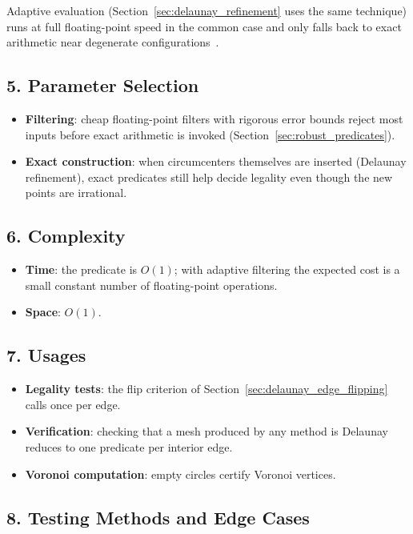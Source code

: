 Adaptive evaluation (Section~\ref{sec:delaunay_refinement} uses the same
technique) runs at full floating-point speed in the common case and only falls
back to exact arithmetic near degenerate configurations~\cite{shewchuk1997}.

\subsection{5. Parameter Selection}

\begin{itemize}
\item \textbf{Filtering}: cheap floating-point filters with rigorous error
  bounds reject most inputs before exact arithmetic is invoked
  (Section~\ref{sec:robust_predicates}).
\item \textbf{Exact construction}: when circumcenters themselves are inserted
  (Delaunay refinement), exact predicates still help decide legality even
  though the new points are irrational.
\end{itemize}

\subsection{6. Complexity}

\begin{itemize}
\item \textbf{Time}: the predicate is $O(1)$; with adaptive filtering the
  expected cost is a small constant number of floating-point operations.
\item \textbf{Space}: $O(1)$.
\end{itemize}

\subsection{7. Usages}

\begin{itemize}
\item \textbf{Legality tests}: the flip criterion of
  Section~\ref{sec:delaunay_edge_flipping} calls  once per edge.
\item \textbf{Verification}: checking that a mesh produced by any method is
  Delaunay reduces to one predicate per interior edge.
\item \textbf{Voronoi computation}: empty circles certify Voronoi vertices.
\end{itemize}

\subsection{8. Testing Methods and Edge Cases}

